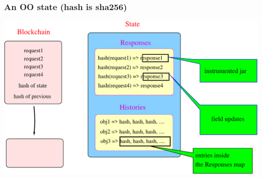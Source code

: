 \documentclass[11pt]{beamer}  %
\begin{document}
\begin{frame}\frametitle{An OO state (hash is sha256)}

  \begin{center}
    \includegraphics[width=\textwidth,clip=false]{pictures/hotmoka-structure.pdf}
  \end{center}

\end{frame}
\end{document}
